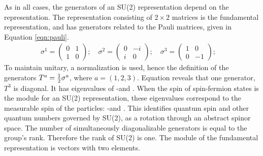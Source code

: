 As in all cases, the generators of an SU(2) representation depend on the representation.
The representation consisting of $2\times2$ matrices is the fundamental representation, and has generators related to the Pauli matrices, given in Equation \ref{eqn:pauli}.
\begin{equation} \begin{split}\label{eqn:pauli}
    \sigma^1=\begin{pmatrix}0&1\\1&0\end{pmatrix} ;\quad
    \sigma^2=\begin{pmatrix}0&-i\\i&0\end{pmatrix} ;\quad
    \sigma^3=\begin{pmatrix}1&0\\0&-1\end{pmatrix} ;\quad
\end{split} \end{equation}
To maintain unitary, a normalization is used, hence the definition of the generators $T^a=\frac{1}{2}\sigma^a$, where $a=(1,2,3)$.
Equation \label{eqn:pauli} reveals that one generator, $T^3$ is diagonal.
It has eigenvalues of -\half and \half.
When the spin of spin-\half fermion states is the module for an SU(2) representation, these eigenvalues correspond to the measurable spin of the particles: -\half and \half.
This identifies quantum spin and other quantum numbers governed by SU(2), as a rotation through an abstract spinor space.
The number of simultaneously diagonalizable generators is equal to the group's rank. Therefore the rank of SU(2) is one.
The module of the fundamental representation is vectors with two elements.

